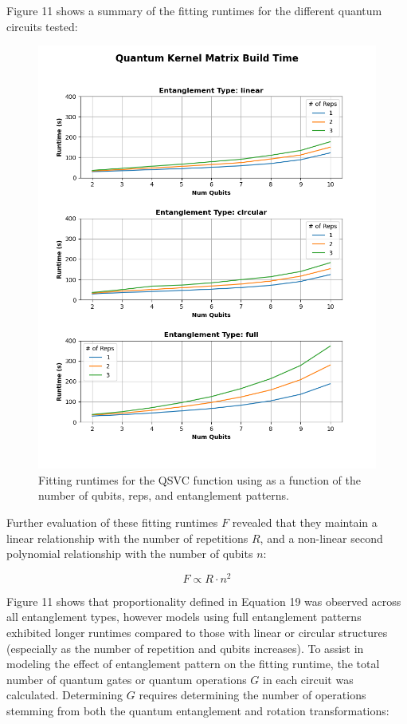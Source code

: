 \documentclass[11pt, oneside]{article}   	%
\begin{document}
Figure 11 shows a summary of the fitting runtimes for the different quantum circuits tested:

\begin{figure}[h!]
    \centering
    \includegraphics[width=1\textwidth]{figures/fig_11.png}
    \captionsetup{font=small} 
    \caption{Fitting runtimes for the QSVC function using as a function of the number of qubits, reps, and entanglement patterns.}
    \label{fig11}
\end{figure}

Further evaluation of these fitting runtimes $F$ revealed that they maintain a linear relationship with the number of repetitions $R$, and a non-linear second polynomial relationship with the number of qubits $n$:

\begin{equation}
F \propto R \cdot n^2
\end{equation}

Figure 11 shows that proportionality defined in Equation 19 was observed across all entanglement types, however models using full entanglement patterns exhibited longer runtimes compared to those with linear or circular structures (especially as the number of repetition and qubits increases). To assist in modeling the effect of entanglement pattern on the fitting runtime, the total number of quantum gates or quantum operations $G$ in each circuit was calculated. Determining $G$ requires determining the number of operations stemming from both the quantum entanglement and rotation transformations:
\end{document}
